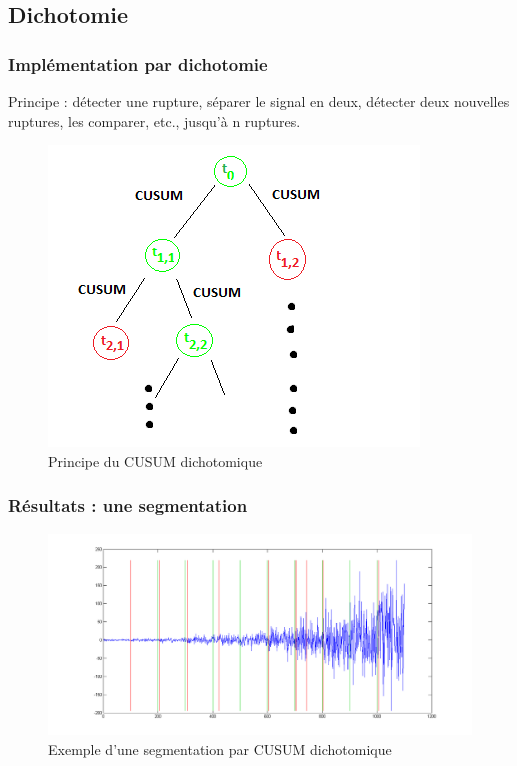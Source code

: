 \documentclass{beamer}
\begin{document}
\subsection{Dichotomie}

\begin{frame}

\frametitle{Implémentation par dichotomie}

Principe : détecter une rupture, séparer le signal en deux, détecter deux nouvelles ruptures, les comparer, etc., jusqu'à n ruptures.
\begin{figure}
	\includegraphics[scale=0.5]{diagramme_cusum_dikt.png}
	\caption{Principe du CUSUM dichotomique}
\end{figure}



\end{frame}

\begin{frame}
	\frametitle{Résultats : une segmentation}
	\begin{figure}
		\includegraphics[scale=0.3]{seg_test_dikt.png}
		\caption{Exemple d'une segmentation par CUSUM dichotomique}
	\end{figure}
\end{frame}
\end{document}
